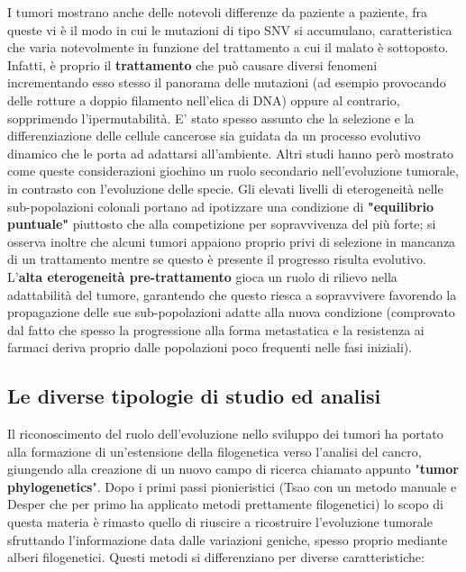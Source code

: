 \documentclass[a4paper]{article}
\begin{document}
	I tumori mostrano anche delle notevoli differenze da paziente a paziente, fra queste vi è il modo in cui le mutazioni di tipo SNV si accumulano,
	caratteristica che varia notevolmente in funzione del trattamento a cui il malato è sottoposto.
	Infatti, è proprio il \textbf{trattamento} che può causare diversi fenomeni incrementando esso stesso
	il panorama delle mutazioni (ad esempio provocando delle rotture a doppio filamento nell'elica di DNA) oppure al contrario, sopprimendo l'ipermutabilità.
	E' stato spesso assunto che la selezione e la differenziazione delle cellule cancerose sia guidata da un
	processo evolutivo dinamico che le porta ad adattarsi all'ambiente. Altri studi hanno però mostrato come
	queste considerazioni giochino un ruolo secondario nell'evoluzione tumorale, in contrasto con l'evoluzione
	delle specie. Gli elevati livelli di eterogeneità nelle sub-popolazioni colonali portano ad ipotizzare una
	condizione di \textbf{"equilibrio puntuale"} piuttosto che alla competizione per sopravvivenza del più forte; si osserva inoltre che alcuni tumori
	appaiono proprio privi di selezione in mancanza di un trattamento mentre se questo è presente il progresso risulta evolutivo.
	L'\textbf{alta eterogeneità pre-trattamento} gioca un ruolo di rilievo nella adattabilità del tumore, garantendo
	che questo riesca a sopravvivere favorendo la propagazione delle sue sub-popolazioni adatte alla nuova
	condizione (comprovato dal fatto che spesso la progressione alla forma metastatica e la resistenza ai
	farmaci deriva proprio dalle popolazioni poco frequenti nelle fasi iniziali).
	
 	\subsection{\large Le diverse tipologie di studio ed analisi}
		
	Il riconoscimento del ruolo dell'evoluzione nello sviluppo dei tumori ha portato alla formazione
	di un'estensione della filogenetica verso l'analisi del cancro, giungendo alla creazione di un nuovo campo di ricerca chiamato appunto "\textbf{tumor phylogenetics}".
	Dopo i primi passi pionieristici (Tsao \cite{Tsao} con un metodo manuale e Desper \cite{Desper} che per primo ha applicato metodi prettamente filogenetici) lo scopo di
	questa materia è rimasto quello di riuscire a ricostruire l'evoluzione tumorale sfruttando l'informazione
	data dalle variazioni geniche, spesso proprio mediante alberi filogenetici.
	Questi metodi si differenziano per diverse caratteristiche:
	
\end{document}
